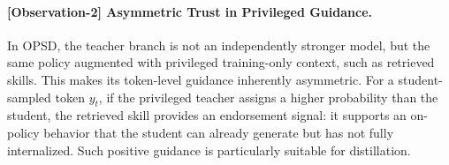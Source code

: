 \documentclass{article} %
\begin{document}
%



\paragraph{[Observation-2] Asymmetric Trust in Privileged Guidance.}
In OPSD, the teacher branch is not an independently stronger model, but the same policy augmented with privileged training-only context, such as retrieved skills. 
This makes its token-level guidance inherently asymmetric. 
For a student-sampled token $y_t$, if the privileged teacher assigns a higher probability than the student, the retrieved skill provides an endorsement signal: it supports an on-policy behavior that the student can already generate but has not fully internalized. 
Such positive guidance is particularly suitable for distillation.
\end{document}

